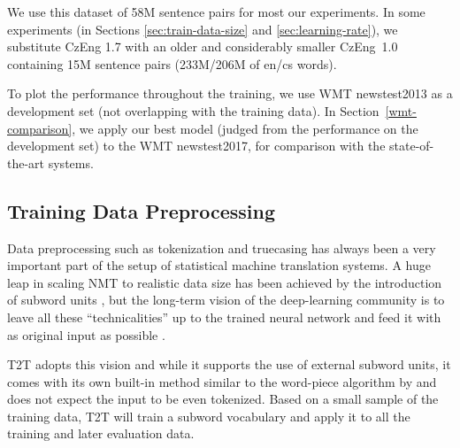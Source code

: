 \documentclass{pbmlarxiv} \pdfoutput=1
\def\Sref#1{Section~\ref{#1}}
\def\perscite#1{\citet{#1}}
\def\parcite#1{\cite{#1}}
\begin{document}
We use this dataset of 58M sentence pairs for most our experiments.
In some experiments (in Sections \ref{sec:train-data-size} and \ref{sec:learning-rate}),
 we substitute CzEng 1.7 with an older and considerably smaller CzEng~1.0 \parcite{czeng10:lrec2012}
 containing 15M sentence pairs (233M/206M of en/cs words).

To plot the performance throughout the training, we use WMT newstest2013
 as a development set (not overlapping with the training data).
In \Sref{wmt-comparison}, we apply our best model
 (judged from the performance on the development set) to the WMT newstest2017,
 for comparison with the state-of-the-art systems.

\subsection{Training Data Preprocessing}
\label{sec:train-data-preproc}

Data preprocessing such as tokenization and truecasing has always been a very important part of the setup of statistical machine translation systems.
A huge leap in scaling NMT to realistic data size has been achieved by the introduction of subword units \parcite{sennrich-haddow-birch:2016:P16-12}, but
the long-term vision of the deep-learning community is to leave all these ``technicalities'' up to the trained neural network and feed it with as original input as possible
 \citep[see e.g.][]{lee:etal:charlevel:2016}.

T2T adopts this vision and while it supports the use of external subword units, it comes with its own built-in method similar to the word-piece algorithm by \perscite{google:bridging:gap:2016:arxiv} and does not expect the input to be even tokenized. Based on a small sample of the training data, T2T will train a subword vocabulary and apply it to all the training and later evaluation data.
\end{document}
